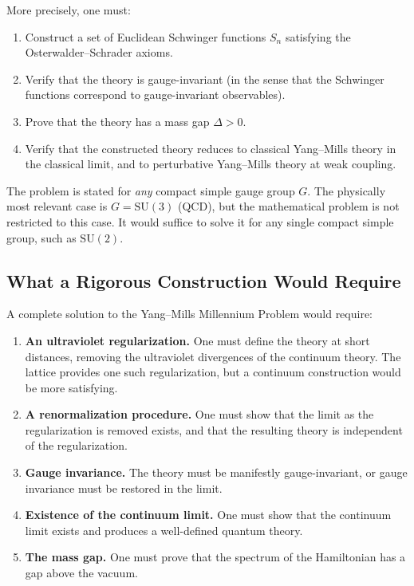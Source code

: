 More precisely, one must:
\begin{enumerate}
  \item Construct a set of Euclidean Schwinger functions $S_n$ satisfying the Osterwalder--Schrader axioms.
  \item Verify that the theory is gauge-invariant (in the sense that the Schwinger functions correspond to gauge-invariant observables).
  \item Prove that the theory has a mass gap $\Delta > 0$.
  \item Verify that the constructed theory reduces to classical Yang--Mills theory in the classical limit, and to perturbative Yang--Mills theory at weak coupling.
\end{enumerate}

The problem is stated for \textit{any} compact simple gauge group $G$. The physically most relevant case is $G = \mathrm{SU}(3)$ (QCD), but the mathematical problem is not restricted to this case. It would suffice to solve it for any single compact simple group, such as $\mathrm{SU}(2)$.

\subsection{What a Rigorous Construction Would Require}

A complete solution to the Yang--Mills Millennium Problem would require:

\begin{enumerate}
  \item \textbf{An ultraviolet regularization.} One must define the theory at short distances, removing the ultraviolet divergences of the continuum theory. The lattice provides one such regularization, but a continuum construction would be more satisfying.

  \item \textbf{A renormalization procedure.} One must show that the limit as the regularization is removed exists, and that the resulting theory is independent of the regularization.

  \item \textbf{Gauge invariance.} The theory must be manifestly gauge-invariant, or gauge invariance must be restored in the limit.

  \item \textbf{Existence of the continuum limit.} One must show that the continuum limit exists and produces a well-defined quantum theory.

  \item \textbf{The mass gap.} One must prove that the spectrum of the Hamiltonian has a gap above the vacuum.
\end{enumerate}

